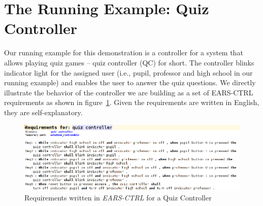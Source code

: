 \vspace{-.5cm}
\section{The Running Example: Quiz Controller}
\label{sec:example}
\vspace{-.3cm}
Our running example for this demonstration is a controller for a system that
allows playing quiz games -- quiz controller (QC) for short. The controller
blinks indicator light for the assigned user (i.e., pupil, professor and high
school in our running example) and enables the user to answer the quiz
questions.
We directly illustrate the behavior of the controller we are building as a set of \textsf{EARS-CTRL} requirements as shown in figure~\ref{fig:QC_reqs}. Given the requirements are written in English, they are self-explanatory.
\begin{figure}[!h]
\centering
\includegraphics[width=1\textwidth]{./images/QC_Reqs.png}
\caption{Requirements written in \emph{EARS-CTRL} for a Quiz Controller}
\label{fig:QC_reqs}
\end{figure}

